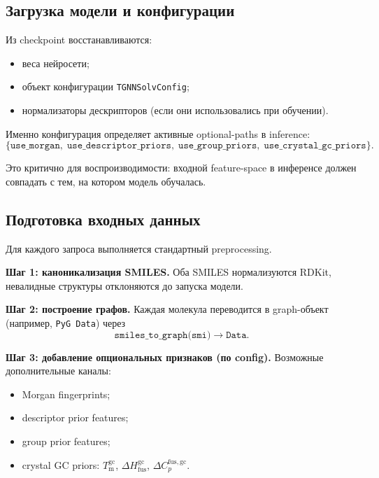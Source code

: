 \documentclass[11pt]{article}
\begin{document}
\subsection{Загрузка модели и конфигурации}

Из checkpoint восстанавливаются:
\begin{itemize}
  \item веса нейросети;
  \item объект конфигурации \texttt{TGNNSolvConfig};
  \item нормализаторы дескрипторов (если они использовались при обучении).
\end{itemize}

Именно конфигурация определяет активные optional-paths в inference:
\begin{equation*}
\{\texttt{use\_morgan},\;\texttt{use\_descriptor\_priors},\;\texttt{use\_group\_priors},\;\texttt{use\_crystal\_gc\_priors}\}.
\end{equation*}

Это критично для воспроизводимости: входной feature-space в инференсе должен совпадать с тем, на котором модель обучалась.

\subsection{Подготовка входных данных}

Для каждого запроса выполняется стандартный preprocessing.

\textbf{Шаг 1: каноникализация SMILES.}
Оба SMILES нормализуются RDKit, невалидные структуры отклоняются до запуска модели.

\textbf{Шаг 2: построение графов.}
Каждая молекула переводится в graph-объект (например, \texttt{PyG Data}) через
\begin{equation*}
\texttt{smiles\_to\_graph(smi)} \rightarrow \texttt{Data}.
\end{equation*}

\textbf{Шаг 3: добавление опциональных признаков (по config).}
Возможные дополнительные каналы:
\begin{itemize}
  \item Morgan fingerprints;
  \item descriptor prior features;
  \item group prior features;
  \item crystal GC priors: $T_{\mathrm{m}}^{\mathrm{gc}}$, $\Delta H_{\mathrm{fus}}^{\mathrm{gc}}$, $\Delta C_p^{\mathrm{fus,gc}}$.
\end{itemize}
\end{document}
